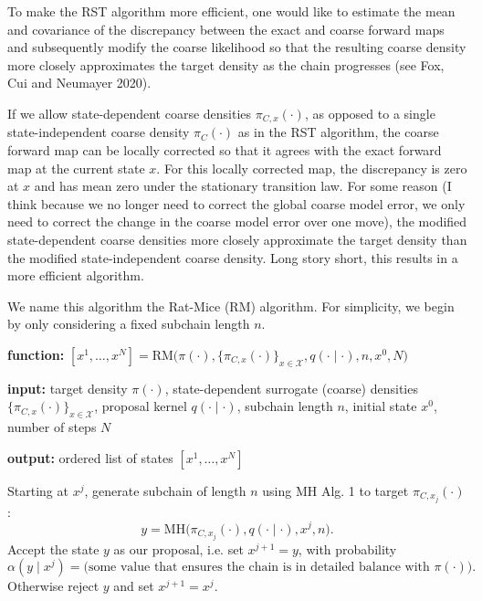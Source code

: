 \documentclass[12pt]{article}
\theoremstyle{definition}
\theoremstyle{remark}
\theoremstyle{plain}
\begin{document}
To make the RST algorithm more efficient, 
one would like to estimate the mean and covariance of the discrepancy between the exact and coarse forward maps 
and subsequently modify the coarse likelihood so that the resulting coarse density more closely approximates the target density as the chain progresses
(see Fox, Cui and Neumayer 2020).

If we allow state-dependent coarse densities $\pi_{C,x}(\cdot)$,
as opposed to a single state-independent coarse density $\pi_{C}(\cdot)$ as in the RST algorithm,
the coarse forward map can be locally corrected so that it agrees with the exact forward map at the current state $x$.
For this locally corrected map, the discrepancy is zero at $x$ and has mean zero under the stationary transition law. 
For some reason (I think because we no longer need to correct the global coarse model error, we only need to correct the 
change in the coarse model error over one move), the modified
state-dependent coarse densities more closely approximate the target density than the modified state-independent coarse density.
Long story short, this results in a more efficient algorithm.

We name this algorithm the Rat-Mice (RM) algorithm.
For simplicity, we begin by only considering a fixed subchain length $n$.

\begin{algorithm}[H]
  \caption{Rat-Mice (RM)}
  \label{alg:rm}
  \textbf{function:} $[x^1,\ldots,x^N] =
  \mathrm{RM}\bigl(\pi(\cdot), \{\pi_{C,x}(\cdot)\}_{x \in \mathcal{X}}, q(\cdot\mid\cdot), n, x^0, N\bigr)$
  
  \textbf{input:} target density $\pi(\cdot)$, state-dependent surrogate (coarse) densities $\{\pi_{C,x}(\cdot)\}_{x \in \mathcal{X}}$, 
  proposal kernel $q(\cdot\mid\cdot)$, subchain length $n$, initial state $x^0$, number of steps $N$
  
  \textbf{output:} ordered list of states $[x^1,\ldots,x^N]$
  
  \begin{algorithmic}[1]
      \State Starting at $x^j$, generate subchain of length $n$ using MH Alg. 1 to target $\pi_{C, x_j}(\cdot)$:
      \[
          y = \mathrm{MH}\bigl(\pi_{C, x_j}(\cdot), q(\cdot\mid\cdot), x^j, n\bigr).
      \]
      \State Accept the state $y$ as our proposal, i.e. set $x^{j+1} = y$, with probability
      \[
          \alpha(y \mid x^j)
          =
          \text{(some value that ensures the chain is in detailed balance with $\pi(\cdot)$)}.
      \]
      \State Otherwise reject $y$ and set $x^{j+1} = x^j$.
  \EndFor
  \end{algorithmic}
\end{algorithm}
\end{document}
